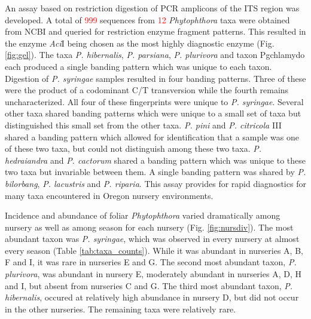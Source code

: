 \documentclass[12pt]{article}
\begin{document}
An assay based on restriction digestion of PCR amplicons of the ITS region was developed.  A total of \textcolor{red}{999} sequences from \textcolor{red}{12} \emph{Phytophthora} taxa were obtained from NCBI and queried for restriction enzyme fragment patterns.  This resulted in the enzyme \emph{Aci}I being chosen as the most highly diagnostic enzyme (Fig. \ref{fig:gel}).  The taxa \emph{P. hibernalis}, \emph{P. parsiana}, \emph{P. plurivora} and taxon Pgchlamydo each produced a single banding pattern which was unique to each taxon.  Digestion of \emph{P. syringae} samples resulted in four banding patterns.  Three of these were the product of a codominant C/T transversion while the fourth remains uncharacterized.  All four of these fingerprints were unique to \emph{P. syringae}.  Several other taxa shared banding patterns which were unique to a small set of taxa but distinguished this small set from the other taxa.  \emph{P. pini} and \emph{P. citricola} III shared a banding pattern which allowed for identification that a sample was one of these two taxa, but could not distinguish among these two taxa.  \emph{P. hedraiandra} and \emph{P. cactorum} shared a banding pattern which was unique to these two taxa but invariable between them.  A single banding pattern was shared by \emph{P. bilorbang}, \emph{P. lacustris} and \emph{P. riparia}.  This assay provides for rapid diagnostics for many taxa encountered in Oregon nursery environments.





Incidence and abundance of foliar \emph{Phytophthora} varied dramatically among nursery as well as among season for each nursery (Fig. \ref{fig:nursdiv}).  The most abundant taxon was \emph{P. syringae}, which was observed in every nursery at almost every season (Table \ref{tab:taxa_counts}).  While it was abundant in nurseries A, B, F and I, it was rare in nurseries E and G.  The second most abundant taxon, \emph{P. plurivora}, was abundant in nursery E, moderately abundant in nurseries A, D, H and I, but absent from nurseries C and G.  The third most abundant taxon, \emph{P. hibernalis}, occured at relatively high abundance in nursery D, but did not occur in the other nurseries.  The remaining taxa were relatively rare.
\end{document}
